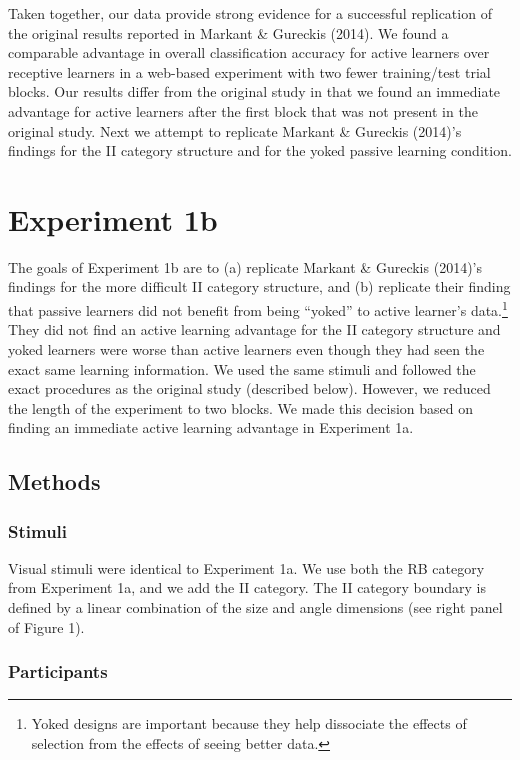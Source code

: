 \documentclass[10pt, letterpaper]{article}
\begin{document}
Taken together, our data provide strong evidence for a successful
replication of the original results reported in Markant \& Gureckis
(2014). We found a comparable advantage in overall classification
accuracy for active learners over receptive learners in a web-based
experiment with two fewer training/test trial blocks. Our results differ
from the original study in that we found an immediate advantage for
active learners after the first block that was not present in the
original study. Next we attempt to replicate Markant \& Gureckis
(2014)'s findings for the II category structure and for the yoked
passive learning condition.

\section{Experiment 1b}\label{experiment-1b}

The goals of Experiment 1b are to (a) replicate Markant \& Gureckis
(2014)'s findings for the more difficult II category structure, and (b)
replicate their finding that passive learners did not benefit from being
``yoked'' to active learner's
data.\footnote{Yoked designs are important because they help dissociate the effects of selection from the effects of seeing better data.}
They did not find an active learning advantage for the II category
structure and yoked learners were worse than active learners even though
they had seen the exact same learning information. We used the same
stimuli and followed the exact procedures as the original study
(described below). However, we reduced the length of the experiment to
two blocks. We made this decision based on finding an immediate active
learning advantage in Experiment 1a.

\subsection{Methods}\label{methods-1}

\subsubsection{Stimuli}\label{stimuli-1}

Visual stimuli were identical to Experiment 1a. We use both the RB
category from Experiment 1a, and we add the II category. The II category
boundary is defined by a linear combination of the size and angle
dimensions (see right panel of Figure 1).

\subsubsection{Participants}\label{participants-1}
\end{document}
